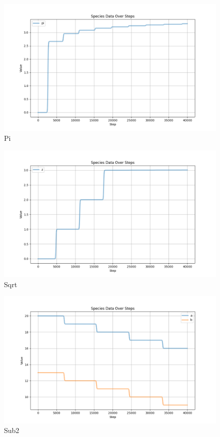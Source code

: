\begin{figure}[H]
    \centering
    \includegraphics[width=\textwidth]{report/figures/SimulatorPlots/piSim.png}
    \caption{Pi}
\end{figure}

\begin{figure}[H]
    \centering
    \includegraphics[width=\textwidth]{report/figures/SimulatorPlots/sqrtSim.png}
    \caption{Sqrt}
\end{figure}

\begin{figure}[H]
    \centering
    \includegraphics[width=\textwidth]{report/figures/SimulatorPlots/sub2Sim.png}
    \caption{Sub2}
\end{figure}









